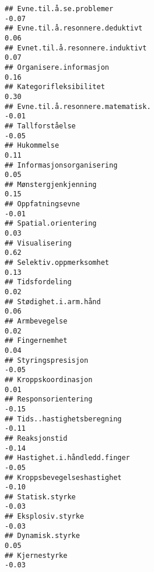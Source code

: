 \documentclass[
]{article}
\begin{document}
\begin{verbatim}
## Evne.til.å.se.problemer                                                          -0.07
## Evne.til.å.resonnere.deduktivt                                                    0.06
## Evnet.til.å.resonnere.induktivt                                                   0.07
## Organisere.informasjon                                                            0.16
## Kategorifleksibilitet                                                             0.30
## Evne.til.å.resonnere.matematisk.                                                 -0.01
## Tallforståelse                                                                   -0.05
## Hukommelse                                                                        0.11
## Informasjonsorganisering                                                          0.05
## Mønstergjenkjenning                                                               0.15
## Oppfatningsevne                                                                  -0.01
## Spatial.orientering                                                               0.03
## Visualisering                                                                     0.62
## Selektiv.oppmerksomhet                                                            0.13
## Tidsfordeling                                                                     0.02
## Stødighet.i.arm.hånd                                                              0.06
## Armbevegelse                                                                      0.02
## Fingernemhet                                                                      0.04
## Styringspresisjon                                                                -0.05
## Kroppskoordinasjon                                                                0.01
## Responsorientering                                                               -0.15
## Tids..hastighetsberegning                                                        -0.11
## Reaksjonstid                                                                     -0.14
## Hastighet.i.håndledd.finger                                                      -0.05
## Kroppsbevegelseshastighet                                                        -0.10
## Statisk.styrke                                                                   -0.03
## Eksplosiv.styrke                                                                 -0.03
## Dynamisk.styrke                                                                   0.05
## Kjernestyrke                                                                     -0.03

\end{verbatim}
\end{document}
